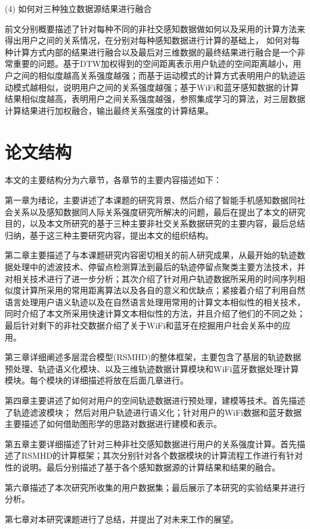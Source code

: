 \par (4) 如何对三种独立数据源结果进行融合
\par 前文分别概要描述了针对每种不同的非社交感知数据做如何以及采用的计算方法来得出用户之间的关系情况，在分别对每种感知数据进行计算的基础上， 如何对每种计算方式内部的结果进行融合以及最后对三维数据的最终结果进行融合是一个非常重要的问题。基于DTW加权得到的空间距离表示用户轨迹的空间距离越小，用户之间的相似度越高关系强度越强；而基于运动模式的计算方式表明用户的轨迹运动模式越相似，说明用户之间的关系强度越强；基于WiFi和蓝牙感知数据的计算结果相似度越高，表明用户之间关系强度越强，参照集成学习的算法，对三层数据计算结果进行加权融合，输出最终关系强度的计算结果。
\section{论文结构}
本文的主要结构分为六章节，各章节的主要内容描述如下：
\par 第一章为绪论，主要讲述了本课题的研究背景、然后介绍了智能手机感知数据同社会关系以及感知数据同人际关系强度研究所解决的问题，最后在提出了本文的研究目的，以及本文所研究的基于三种主要非社交关系数据研究的主要内容，最后总结归纳，基于这三种主要研究内容，提出本文的组织结构。
\par 第二章主要描述了与本课题研究内容密切相关的前人研究成果，从最开始的轨迹数据处理中的滤波技术、停留点检测算法到最后的轨迹停留点聚类主要方法技术，并对相关技术进行了进一步分析；其次介绍了针对用户轨迹数据所采用的时间序列相似度计算所采用的常用距离算法以及各自的意义和优缺点；紧接着介绍了利用自然语言处理用户语义轨迹以及在自然语言处理用常用的计算文本相似性的相关技术，同时介绍了本文所采用快速计算文本相似性的方法，并且介绍了他们的不同之处；最后针对剩下的非社交数据介绍了关于WiFi和蓝牙在挖掘用户社会关系中的应用。
\par 第三章详细阐述多层混合模型(RSMHD)的整体框架，主要包含了基层的轨迹数据预处理、轨迹语义化模块、以及三维轨迹数据计算模块和WiFi蓝牙数据处理计算模块。每个模块的详细描述将放在后面几章进行。
\par 第四章主要讲述了如何对用户的空间轨迹数据进行预处理，建模等技术。首先描述了轨迹滤波模块；%
然后对用户轨迹进行语义化；针对用户的WiFi数据和蓝牙数据主要描述了如何借助图形学的思路对数据进行建模和表示。
\par 第五章主要详细描述了针对三种非社交感知数据进行用户的关系强度计算。首先描述了RSMHD的计算框架；其次分别针对各个数据模块的计算流程工作进行有针对性的说明。最后分别描述了基于各个感知数据源的计算结果和结果的融合。
\par 第六章描述了本次研究所收集的用户数据集；最后展示了本研究的实验结果并进行分析。
\par 第七章对本研究课题进行了总结，并提出了对未来工作的展望。
